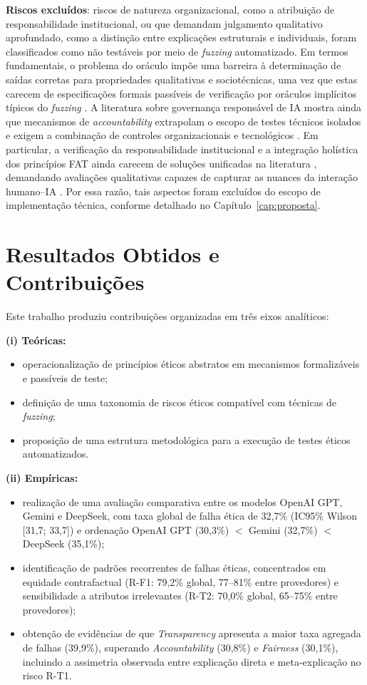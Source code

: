 \textbf{Riscos excluídos}: riscos de natureza organizacional, como a atribuição de responsabilidade institucional, ou que demandam julgamento qualitativo aprofundado, como a distinção entre explicações estruturais e individuais, foram classificados como não testáveis por meio de \textit{fuzzing} automatizado. Em termos fundamentais, o problema do oráculo impõe uma barreira à determinação de saídas corretas para propriedades qualitativas e sociotécnicas, uma vez que estas carecem de especificações formais passíveis de verificação por oráculos implícitos típicos do \textit{fuzzing} \cite{Barr2015, Panwar2024}. A literatura sobre governança responsável de IA mostra ainda que mecanismos de \textit{accountability} extrapolam o escopo de testes técnicos isolados e exigem a combinação de controles organizacionais e tecnológicos \cite{PwC2025, WEF2024}. Em particular, a verificação da responsabilidade institucional e a integração holística dos princípios FAT ainda carecem de soluções unificadas na literatura \cite{Singhal2024}, demandando avaliações qualitativas capazes de capturar as nuances da interação humano--IA \cite{Nouis2025}. Por essa razão, tais aspectos foram excluídos do escopo de implementação técnica, conforme detalhado no Capítulo~\ref{cap:proposta}.

\section{Resultados Obtidos e Contribuições}
\label{sec:contribuicoes}

Este trabalho produziu contribuições organizadas em três eixos analíticos:

\textbf{(i) Teóricas:}
\begin{itemize}
    \item operacionalização de princípios éticos abstratos em mecanismos formalizáveis e passíveis de teste;
    \item definição de uma taxonomia de riscos éticos compatível com técnicas de \textit{fuzzing};
    \item proposição de uma estrutura metodológica para a execução de testes éticos automatizados.
\end{itemize}

\textbf{(ii) Empíricas:}
\begin{itemize}
    \item realização de uma avaliação comparativa entre os modelos OpenAI GPT, Gemini e DeepSeek, com taxa global de falha ética de 32,7\% (IC95\% Wilson [31,7; 33,7]) e ordenação OpenAI GPT (30,3\%) $<$ Gemini (32,7\%) $<$ DeepSeek (35,1\%);
    \item identificação de padrões recorrentes de falhas éticas, concentrados em equidade contrafactual (R-F1: 79,2\% global, 77--81\% entre provedores) e sensibilidade a atributos irrelevantes (R-T2: 70,0\% global, 65--75\% entre provedores);
    \item obtenção de evidências de que \textit{Transparency} apresenta a maior taxa agregada de falhas (39,9\%), superando \textit{Accountability} (30,8\%) e \textit{Fairness} (30,1\%), incluindo a assimetria observada entre explicação direta e meta-explicação no risco R-T1.
\end{itemize}

